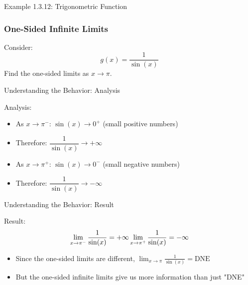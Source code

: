 \documentclass[aspectratio=169]{beamer}
\begin{document}
\begin{frame}{Example 1.3.12: Trigonometric Function}
\frametitle{One-Sided Infinite Limits}

\begin{block}{Consider:}
$$g(x) = \frac{1}{\sin(x)}$$
Find the one-sided limits as $x \to \pi$.
\end{block}

\begin{center}
\end{center}

\end{frame}

\begin{frame}{Understanding the Behavior: Analysis}
\begin{block}{Analysis:}
\begin{itemize}
  \item As $x \to \pi^-$: $\sin(x) \to 0^+$ (small positive numbers)
  \item Therefore: $\dfrac{1}{\sin(x)} \to +\infty$
  \item As $x \to \pi^+$: $\sin(x) \to 0^-$ (small negative numbers)
  \item Therefore: $\dfrac{1}{\sin(x)} \to -\infty$
\end{itemize}
\end{block}
\end{frame}

\begin{frame}{Understanding the Behavior: Result}
\begin{block}{Result:}
\[
\lim_{x \to \pi^-} \frac{1}{\sin(x)} = +\infty \\
\lim_{x \to \pi^+} \frac{1}{\sin(x)} = -\infty
\]
\end{block}

\begin{itemize}
  \item Since the one-sided limits are different, $\lim_{x \to \pi} \frac{1}{\sin(x)} = \text{DNE}$
  \item But the one-sided infinite limits give us more information than just "DNE"
\end{itemize}
\end{frame}
\end{document}
